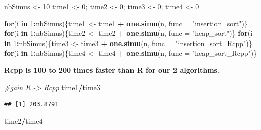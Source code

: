 \documentclass[
]{article}
\newenvironment{Shaded}{\begin{snugshade}}{\end{snugshade}}
\newcommand{\AttributeTok}[1]{\textcolor[rgb]{0.13,0.29,0.53}{#1}}
\newcommand{\CommentTok}[1]{\textcolor[rgb]{0.56,0.35,0.01}{\textit{#1}}}
\newcommand{\ControlFlowTok}[1]{\textcolor[rgb]{0.13,0.29,0.53}{\textbf{#1}}}
\newcommand{\DecValTok}[1]{\textcolor[rgb]{0.00,0.00,0.81}{#1}}
\newcommand{\FunctionTok}[1]{\textcolor[rgb]{0.13,0.29,0.53}{\textbf{#1}}}
\newcommand{\NormalTok}[1]{#1}
\newcommand{\OtherTok}[1]{\textcolor[rgb]{0.56,0.35,0.01}{#1}}
\newcommand{\SpecialCharTok}[1]{\textcolor[rgb]{0.81,0.36,0.00}{\textbf{#1}}}
\newcommand{\StringTok}[1]{\textcolor[rgb]{0.31,0.60,0.02}{#1}}
\begin{document}
\begin{Shaded}
\begin{Highlighting}[]
\NormalTok{nbSimus }\OtherTok{\textless{}{-}} \DecValTok{10}
\NormalTok{time1 }\OtherTok{\textless{}{-}} \DecValTok{0}\NormalTok{; time2 }\OtherTok{\textless{}{-}} \DecValTok{0}\NormalTok{; time3 }\OtherTok{\textless{}{-}} \DecValTok{0}\NormalTok{; time4 }\OtherTok{\textless{}{-}} \DecValTok{0}

\ControlFlowTok{for}\NormalTok{(i }\ControlFlowTok{in} \DecValTok{1}\SpecialCharTok{:}\NormalTok{nbSimus)\{time1 }\OtherTok{\textless{}{-}}\NormalTok{ time1 }\SpecialCharTok{+} \FunctionTok{one.simu}\NormalTok{(n, }\AttributeTok{func =} \StringTok{"insertion\_sort"}\NormalTok{)\}}
\ControlFlowTok{for}\NormalTok{(i }\ControlFlowTok{in} \DecValTok{1}\SpecialCharTok{:}\NormalTok{nbSimus)\{time2 }\OtherTok{\textless{}{-}}\NormalTok{ time2 }\SpecialCharTok{+} \FunctionTok{one.simu}\NormalTok{(n, }\AttributeTok{func =} \StringTok{"heap\_sort"}\NormalTok{)\}}
\ControlFlowTok{for}\NormalTok{(i }\ControlFlowTok{in} \DecValTok{1}\SpecialCharTok{:}\NormalTok{nbSimus)\{time3 }\OtherTok{\textless{}{-}}\NormalTok{ time3 }\SpecialCharTok{+} \FunctionTok{one.simu}\NormalTok{(n, }\AttributeTok{func =} \StringTok{"insertion\_sort\_Rcpp"}\NormalTok{)\}}
\ControlFlowTok{for}\NormalTok{(i }\ControlFlowTok{in} \DecValTok{1}\SpecialCharTok{:}\NormalTok{nbSimus)\{time4 }\OtherTok{\textless{}{-}}\NormalTok{ time4 }\SpecialCharTok{+} \FunctionTok{one.simu}\NormalTok{(n, }\AttributeTok{func =} \StringTok{"heap\_sort\_Rcpp"}\NormalTok{)\}}
\end{Highlighting}
\end{Shaded}

\textbf{Rcpp is 100 to 200 times faster than R for our 2 algorithms.}

\begin{Shaded}
\begin{Highlighting}[]
\CommentTok{\#gain R {-}\textgreater{} Rcpp}
\NormalTok{time1}\SpecialCharTok{/}\NormalTok{time3}
\end{Highlighting}
\end{Shaded}

\begin{verbatim}
## [1] 203.8791
\end{verbatim}

\begin{Shaded}
\begin{Highlighting}[]
\NormalTok{time2}\SpecialCharTok{/}\NormalTok{time4}
\end{Highlighting}
\end{Shaded}
\end{document}
